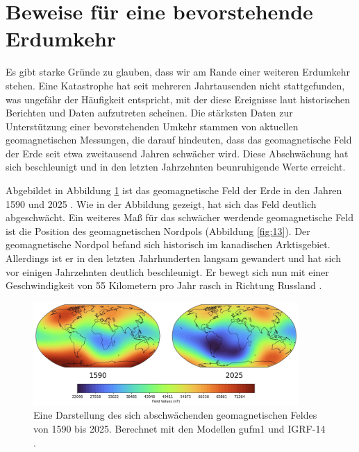 \documentclass[10pt,twocolumn,letterpaper]{article}
\begin{document}
\section{Beweise für eine bevorstehende Erdumkehr}

Es gibt starke Gründe zu glauben, dass wir am Rande einer weiteren Erdumkehr stehen. Eine Katastrophe hat seit mehreren Jahrtausenden nicht stattgefunden, was ungefähr der Häufigkeit entspricht, mit der diese Ereignisse laut historischen Berichten und Daten aufzutreten scheinen. Die stärksten Daten zur Unterstützung einer bevorstehenden Umkehr stammen von aktuellen geomagnetischen Messungen, die darauf hindeuten, dass das geomagnetische Feld der Erde seit etwa zweitausend Jahren schwächer wird. Diese Abschwächung hat sich beschleunigt und in den letzten Jahrzehnten beunruhigende Werte erreicht.

Abgebildet in Abbildung \ref{fig:14} ist das geomagnetische Feld der Erde in den Jahren 1590 und 2025 \cite{125,126}. Wie in der Abbildung gezeigt, hat sich das Feld deutlich abgeschwächt.
Ein weiteres Maß für das schwächer werdende geomagnetische Feld ist die Position des geomagnetischen Nordpols (Abbildung \ref{fig:13}). Der geomagnetische Nordpol befand sich historisch im kanadischen Arktisgebiet. Allerdings ist er in den letzten Jahrhunderten langsam gewandert und hat sich vor einigen Jahrzehnten deutlich beschleunigt. Er bewegt sich nun mit einer Geschwindigkeit von 55 Kilometern pro Jahr rasch in Richtung Russland \cite{124}.

\begin{figure}[t]
\begin{center}
\includegraphics[width=0.9\textwidth]{saa.jpg}
\end{center}
   \caption{Eine Darstellung des sich abschwächenden geomagnetischen Feldes von 1590 bis 2025. Berechnet mit den Modellen gufm1 und IGRF-14 \cite{125,126}.}
\label{fig:14}
\end{figure}
\end{document}
